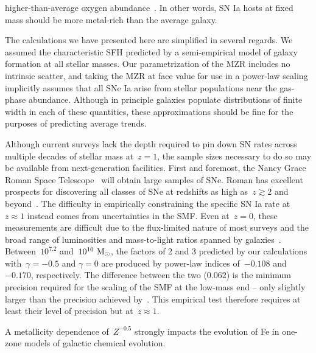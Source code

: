 \documentclass[foo.tex]{subfiles}
\begin{document}
higher-than-average oxygen abundance~\citep[see, e.g.,][]{Johnson2020}.
In other words, SN Ia hosts at fixed mass should be more metal-rich than the
average galaxy.
\par
The calculations we have presented here are simplified in several regards.
We assumed the characteristic SFH predicted by a semi-empirical model of
galaxy formation at all stellar masses.
Our parametrization of the MZR includes no intrinsic scatter, and taking the
\citet{Zahid2014} MZR at face value for use in a power-law scaling implicitly
assumes that all SNe Ia arise from stellar populations near the gas-phase
abundance.
Although in principle galaxies populate distributions of finite width in each
of these quantities, these approximations should be fine for the purposes of
predicting average trends.
\par
Although current surveys lack the depth required to pin down SN rates across
multiple decades of stellar mass at~$z = 1$, the sample sizes necessary to do
so may be available from next-generation facilities.
First and foremost, the Nancy Grace Roman Space Telescope~\citep{Spergel2013,
Spergel2015} will obtain large samples of SNe.
Roman has excellent prospects for discovering all classes of SNe at redshifts
as high as~$z \gtrsim 2$ and beyond~\citep{Petrushevska2016}.
The difficulty in empirically constraining the specific SN Ia rate at
$z \approx 1$ instead comes from uncertainties in the SMF.
Even at~$z = 0$, these measurements are difficult due to the flux-limited
nature of most surveys and the broad range of luminosities and mass-to-light
ratios spanned by galaxies~\citep[see the discussion in][]{Weigel2016}.
Between~$10^{7.2}$ and~$10^{10}~\text{M}_\odot$, the factors of 2 and 3 predicted by our
calculations with~$\gamma = -0.5$ and $\gamma = 0$ are produced by power-law
indices of~$-0.108$ and~$-0.170$, respectively.
The difference between the two (0.062) is the minimum precision required for
the scaling of the SMF at the low-mass end -- only slightly larger than the
precision achieved by~\citet[][$\pm 0.05$, see their Fig. 13]{Baldry2012}.
This empirical test therefore requires at least their level of precision but
at~$z \approx 1$.
\par
A metallicity dependence of~$Z^{-0.5}$ strongly impacts the evolution of Fe
in one-zone models of galactic chemical evolution.
\end{document}
